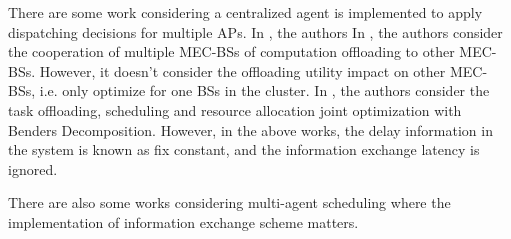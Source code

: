 
There are some work considering a centralized agent is implemented to apply dispatching decisions for multiple APs.
In \cite{IOTJ19-CaoJ}, the authors
In \cite{Fan2017}, the authors consider the cooperation of multiple MEC-BSs of computation offloading to other MEC-BSs. However, it doesn't consider the offloading utility impact on other MEC-BSs, i.e. only optimize for one BSs in the cluster.
In \cite{JSAC19-AlameddineHA}, the authors consider the task offloading, scheduling and resource allocation joint optimization with Benders Decomposition.
However, in the above works, the delay information in the system is known as fix constant, and the information exchange latency is ignored.

There are also some works considering multi-agent scheduling where the implementation of information exchange scheme matters.


